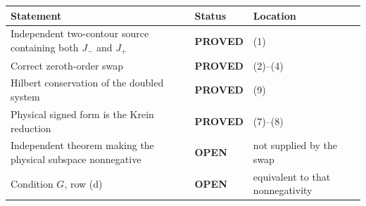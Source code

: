 \documentclass[11pt]{article}
\newcommand{\PROVED}{\textcolor{green!40!black}{\textbf{PROVED}}}
\newcommand{\OPEN}{\textcolor{red!70!black}{\textbf{OPEN}}}
\begin{document}
\begin{center}
\begin{tabular}{>{\raggedright\arraybackslash}p{.56\linewidth}
                >{\centering\arraybackslash}p{.15\linewidth}
                >{\raggedright\arraybackslash}p{.19\linewidth}}
\toprule
Statement & Status & Location \\
\midrule
Independent two-contour source containing both $J_-$ and $J_+$ & \PROVED & (1) \\
Correct zeroth-order swap & \PROVED & (2)--(4) \\
Hilbert conservation of the doubled system & \PROVED & (9) \\
Physical signed form is the Krein reduction & \PROVED & (7)--(8) \\
Independent theorem making the physical subspace nonnegative & \OPEN & not supplied by the swap \\
Condition $G$, row (d) & \OPEN & equivalent to that nonnegativity \\
\bottomrule
\end{tabular}
\end{center}
\end{document}
